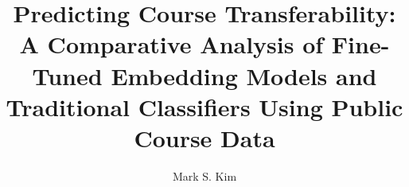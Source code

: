 \documentclass{sfsuthesis}
\begin{document}

\title{Predicting Course Transferability: A Comparative Analysis of Fine-Tuned Embedding Models and Traditional Classifiers Using Public Course Data}
\author{Mark S. Kim}





% 





%     





\pagestyle{headings}







\printbibheading
\sloppy
\printbibliography
\fussy

% 
\end{document}
